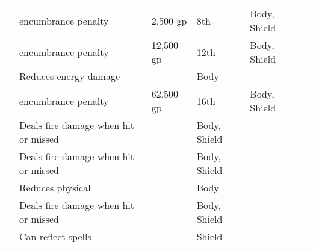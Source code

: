 \begin{longtabuwrapper}
\begin{longtabu}{l X l l l l}
                  &  encumbrance penalty & 2,500 gp & 8th & Body, Shield &  \\
                  &  encumbrance penalty & 12,500 gp & 12th & Body, Shield &  \\
                 & Reduces energy damage &  & Body &  \\
                  &  encumbrance penalty & 62,500 gp & 16th & Body, Shield &  \\
                 & Deals fire damage when hit or missed &  & Body, Shield &  \\
                 & Deals fire damage when hit or missed &  & Body, Shield &  \\
                 & Reduces physical &  & Body &  \\
                 & Deals fire damage when hit or missed &  & Body, Shield &  \\
                 & Can reflect spells &  & Shield &  \\


\end{longtabu}
\end{longtabuwrapper}
